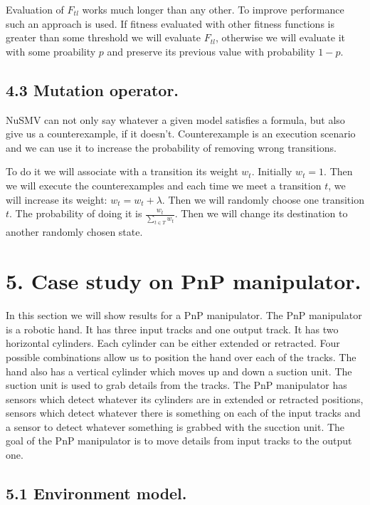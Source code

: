 \documentclass[fleqn,twocolumn]{article}
\begin{document}
Evaluation of $F_{tl}$ works much longer than any other. To improve performance such an approach is used. If fitness evaluated with other fitness functions is
greater than some threshold we will evaluate $F_{tl}$, otherwise we will evaluate it with some proability $p$ and preserve its previous value with probability $1 - p$.

\subsection{4.3 Mutation operator.}

NuSMV can not only say whatever a given model satisfies a formula, but also give us a counterexample, if it doesn't. Counterexample is an execution scenario and we can
use it to increase the probability of removing wrong transitions.

To do it we will associate with a transition its weight $w_t$. Initially $w_t = 1$. Then we will execute the counterexamples and each time we meet a transition $t$, we
will increase its weight: $w_t = w_t + \lambda$. Then we will randomly choose one transition $t$. The probability of doing it is $\frac{w_t}{\sum_{t \in T}w_t}$.
Then we will change its destination to another randomly chosen state.

\section{5. Case study on PnP manipulator.}

In this section we will show results for a PnP manipulator. The PnP manipulator is a robotic hand. It has three input tracks and one output track.
It has two horizontal cylinders. Each cylinder can be either extended or retracted. Four possible combinations allow us to position the hand
over each of the tracks. The hand also has a vertical cylinder which moves up and down a suction unit. The suction unit is used to grab details
from the tracks. The PnP manipulator has sensors which detect whatever its cylinders are in extended or retracted positions, sensors which detect
whatever there is something on each of the input tracks and a sensor to detect whatever something is grabbed with the sucction unit. The goal
of the PnP manipulator is to move details from input tracks to the output one.

\subsection{5.1 Environment model.}
\end{document}
